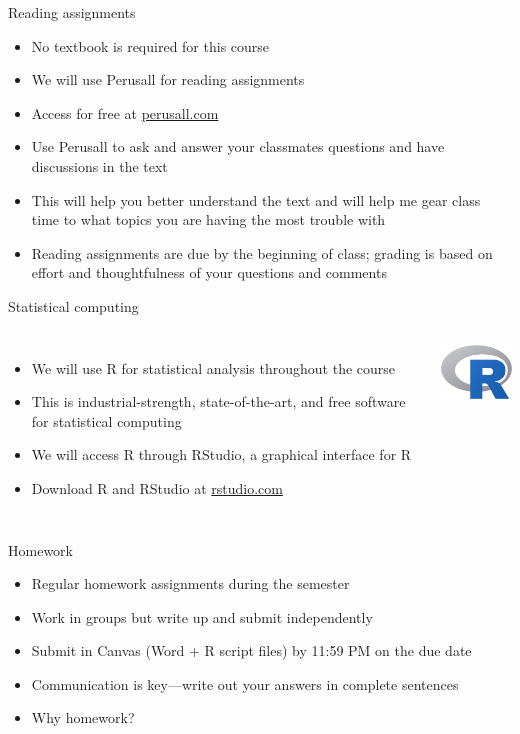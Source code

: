 \documentclass{beamer}\usepackage[]{graphicx}\usepackage[]{color}
\begin{document}
\begin{darkframes}
    \begin{frame}{Reading assignments}
      \begin{itemize}
        \item No textbook is required for this course
        \item We will use \alert{Perusall} for reading assignments
        \item Access for free at \url{perusall.com}
        \item Use Perusall to ask and answer your classmates questions and have discussions in the text
        \item This will help you better understand the text and will help me gear class time to what topics you are having the most trouble with
        \item Reading assignments are due by the beginning of class; grading is based on effort and thoughtfulness of your questions and comments
      \end{itemize}
    \end{frame}

    \begin{frame}{Statistical computing}
      \begin{columns}[onlytextwidth]
          \begin{itemize}
            \item We will use \alert{R} for statistical analysis throughout the course
            \item This is industrial-strength, state-of-the-art, and free software for statistical computing
            \item We will access R through \alert{RStudio}, a graphical interface for R
            \item Download R and RStudio at \url{rstudio.com}
          \end{itemize}
          \includegraphics[width=1in]{R}
      \end{columns}
    \end{frame}

    \begin{frame}{Homework}
      \begin{itemize}
        \item Regular homework assignments during the semester
        \item Work in groups but write up and submit independently
        \item Submit in Canvas (Word + R script files) by 11:59 PM on the due date
        \item Communication is key---write out your answers in complete sentences
        \item Why homework?
      \end{itemize}
    \end{frame}


\end{darkframes}
\end{document}
